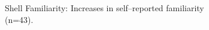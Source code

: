 \documentclass[10pt, twocolumn]{article}
\begin{document}
\begin{figure}
	\centering
	\begin{subfigure}[t]{0.47\columnwidth}
		\centering
		\caption{Shell Familiarity: Increases in self--reported familiarity (n=43).}
		\label{shellFamiliarity}
	\end{subfigure}
	\begin{subfigure}[t]{0.47\columnwidth}
		\centering

\end{subfigure}
\end{figure}
\end{document}
